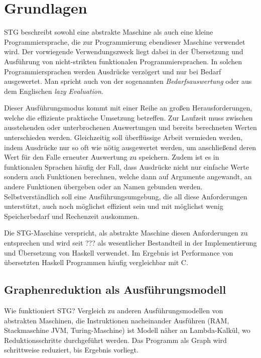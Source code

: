 
\chapter{Grundlagen}\label{chap:grundlagen}

STG beschreibt sowohl eine abstrakte Maschine als auch eine kleine Programmiersprache, die zur Programmierung ebendieser Maschine verwendet wird.
Der vorwiegende Verwendungszweck liegt dabei in der Übersetzung und Ausführung von nicht-strikten funktionalen Programmiersprachen.
In solchen Programmiersprachen werden Ausdrücke verzögert und nur bei Bedarf ausgewertet.
Man spricht auch von der sogenannten \textit{Bedarfsauswertung} oder aus dem Englischen \textit{lazy Evaluation}.

Dieser Ausführungsmodus kommt mit einer Reihe an großen Herausforderungen, welche die effiziente praktische Umsetzung betreffen.
Zur Laufzeit muss zwischen ausstehenden oder unterbrochenen Auswertungen und bereits berechneten Werten unterschieden werden.
Gleichzeitig soll überflüssige Arbeit vermieden werden, indem Ausdrücke nur so oft wie nötig ausgewertet werden, um anschließend deren Wert für den Falle erneuter Auswertung zu speichern.
Zudem ist es in funktionalen Sprachen häufig der Fall, dass Ausdrücke nicht nur einfache Werte sondern auch Funktionen berechnen, welche dann auf Argumente angewandt, an andere Funktionen übergeben oder an Namen gebunden werden.
Selbstverständlich soll eine Ausführungsumgebung, die all diese Anforderungen unterstützt, auch noch möglichst effizient sein und mit möglichst wenig Speicherbedarf und Rechenzeit auskommen.

Die STG-Maschine verspricht, als abstrakte Maschine diesen Anforderungen zu entsprechen und wird seit ??? als  wesentlicher Bestandteil in der Implementierung und Übersetzung von Haskell verwendet.
Im Ergebnis ist Performance von übersetzten Haskell Programmen häufig vergleichbar mit C.\cn{}


\section{Graphenreduktion als Ausführungsmodell}

Wie funktioniert STG?
Vergleich zu anderen Ausführungsmodellen von abstrakten Maschinen, die Instruktionen nacheinander Ausführen (RAM, Stackmaschine JVM, Turing-Maschine) ist Modell näher an Lambda-Kalkül, wo Reduktionsschritte durchgeführt werden.
Das Programm als Graph wird schrittweise reduziert, bis Ergebnis vorliegt.


